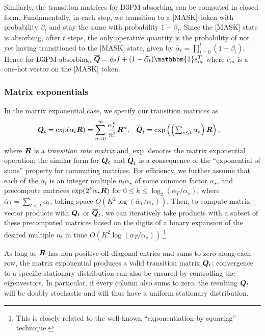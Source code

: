 Similarly, the transition matrices for D3PM absorbing can be computed in closed form. Fundamentally, in each step, we transition to a [MASK] token with probability $\beta_t$ and stay the same with probability $1 - \beta_t$. Since the [MASK] state is absorbing, after $t$ steps, the only operative quantity is the probability of not yet having transitioned to the [MASK] state, given by $\widetilde{\alpha_t} = \prod_{i=0}^t (1 - \beta_i)$. Hence for D3PM absorbing, $\barbQ=\Tilde{\alpha_t} I + (1 - \widetilde{\alpha_t}) \mathbbm{1} e^T_m$ where $e_m$ is a one-hot vector on the [MASK] token.

\subsubsection{Matrix exponentials}
In the matrix exponential case, we specify our transition matrices as
\begin{align}
\boldsymbol{Q}_t &= \exp(\alpha_t \boldsymbol{R}) = \sum_{n = 0}^\infty \frac{\alpha_t^n}{n!} \boldsymbol{R}^n,
&
\overline{\boldsymbol{Q}}_t &= \textstyle \exp\left(\left(\sum_{s \le t} \alpha_s\right) \boldsymbol{R}\right),
\label{eq:matrix-exponential-parameterization}
\end{align}
where $\boldsymbol{R}$ is a \emph{transition rate matrix} and $\exp$ denotes the matrix exponential operation; the similar form for $\boldsymbol{Q}_t$ and $\overline{\boldsymbol{Q}}_t$ is a consequence of the ``exponential of sums'' property for commuting matrices.
For efficiency, we further assume that each of the $\alpha_t$ is an integer multiple $n_t\alpha_\star$ of some common factor $\alpha_\star$, and precompute matrices $\exp(2^k \alpha_\star \boldsymbol{R})$ for $0 \le k \le \log_2 (\overline{\alpha}_T / \alpha_\star)$, where $\overline{\alpha}_T = \sum_{t < T} \alpha_t$, taking space $O(K^2 \log (\overline{\alpha}_T / \alpha_\star))$. Then, to compute matrix-vector products with $\boldsymbol{Q}_t$ or $\overline{\boldsymbol{Q}}_t$, we can iteratively take products with a subset of these precomputed matrices based on the digits of a binary expansion of the desired multiple $n_t$ in time $O(K^2  \log (\overline{\alpha}_T / \alpha_\star))$.\footnote{This is closely related to the well-known ``exponentiation-by-squaring'' technique.}

As long as $\boldsymbol{R}$ has non-positive off-diagonal entries and sums to zero along each row, the matrix exponential produces a valid transition matrix $\boldsymbol{Q}_t$; convergence to a specific stationary distribution can also be ensured by controlling the eigenvectors. In particular, if every column also sums to zero, the resulting $\boldsymbol{Q}_t$ will be doubly stochastic and will thus have a uniform stationary distribution.

